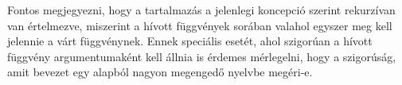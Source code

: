 Fontos megjegyezni, hogy a tartalmazás a jelenlegi koncepció szerint rekurzívan van értelmezve, miszerint a hívott függvények sorában valahol egyszer meg kell jelennie a várt függvénynek.
Ennek speciális esetét, ahol szigorúan a hívott függvény argumentumaként kell állnia is érdemes mérlegelni, hogy a szigorúság, amit bevezet  egy alapból nagyon megengedő nyelvbe megéri-e.















